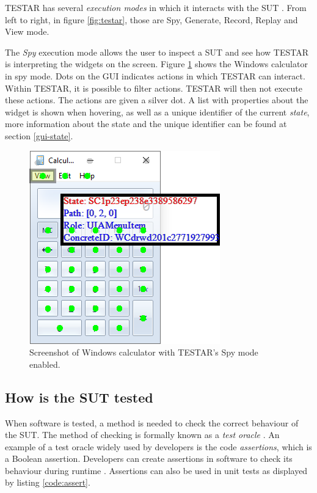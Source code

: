     TESTAR has several \emph{execution modes} in which it interacts with the SUT \cite{testar-manual}. From left to right, in figure \ref{fig:testar}, those are Spy, Generate, Record, Replay and View mode. 

    The \emph{Spy} execution mode allows the user to inspect a SUT and see how TESTAR is interpreting the widgets on the screen. Figure \ref{fig:calc-spy} shows the Windows calculator in spy mode. Dots on the GUI indicates actions in which TESTAR can interact. Within TESTAR, it is possible to filter actions. TESTAR will then not execute these actions. The actions are given a silver dot. A list with properties about the widget is shown when hovering, as well as a unique identifier of the current \emph{state}, more information about the state and the unique identifier can be found at section \ref{gui-state}.

    \begin{figure}[h]
        \includegraphics{pics/calc-state.png}
        \caption{Screenshot of Windows calculator with TESTAR's Spy mode enabled.}
        \label{fig:calc-spy}
    \end{figure}


\subsection{How is the SUT tested}
    When software is tested, a method is needed to check the correct behaviour of the SUT. The method of checking is formally known as a \emph{test oracle} \cite{testOracles}. An example of a test oracle widely used by developers is the code \emph{assertions}, which is a Boolean assertion. Developers can create assertions in software to check its behaviour during runtime \cite{barr2014oracle}. Assertions can also be used in unit tests as displayed by listing \ref{code:assert}. 


